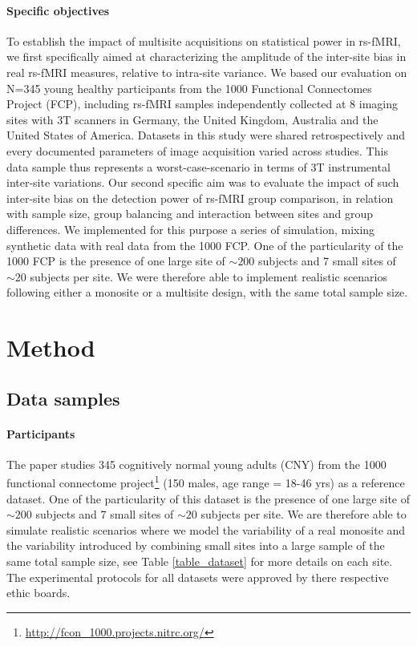 \documentclass[authoryear]{elsarticle}
\begin{document}
\paragraph{Specific objectives}
To establish the impact of multisite acquisitions on statistical power in rs-fMRI, we first specifically aimed at characterizing the amplitude of the inter-site bias in real rs-fMRI measures, relative to intra-site variance. We based our evaluation on N=345 young healthy participants from the 1000 Functional Connectomes Project (FCP), including rs-fMRI samples independently collected at 8 imaging sites with 3T scanners in Germany, the United Kingdom, Australia and the United States of America. Datasets in this study were shared retrospectively and every documented parameters of image acquisition varied across studies. This data sample thus represents a worst-case-scenario in terms of 3T instrumental inter-site variations. Our second specific aim was to evaluate the impact of such inter-site bias on the detection power of rs-fMRI group comparison, in relation with sample size, group balancing and interaction between sites and group differences. We implemented for this purpose a series of simulation, mixing synthetic data with real data from the 1000 FCP. One of the particularity of the 1000 FCP is the presence of one large site of $\sim200$ subjects and 7 small sites of $\sim20$ subjects per site. We were therefore able to implement realistic scenarios following either a monosite or a multisite design, with the same total sample size.

\section{Method}

\subsection{Data samples} 

\paragraph{Participants}
The paper studies 345 cognitively normal young adults (CNY) from the 1000 functional connectome project\footnote{\url{http://fcon_1000.projects.nitrc.org/}} (150 males, age range = 18-46 yrs) as a reference dataset. One of the particularity of this dataset is the presence of one large site of $\sim200$ subjects and 7 small sites of $\sim20$ subjects per site. We are therefore able to simulate realistic scenarios where we model the variability of a real monosite and the variability introduced by combining small sites into a large sample of the same total sample size, see Table \ref{table_dataset} for more details on each site. The experimental protocols for all datasets were approved by there respective ethic boards.
\end{document}

